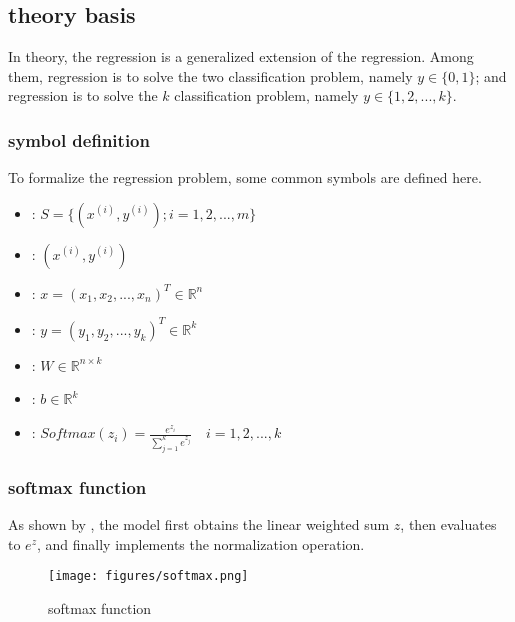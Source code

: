 \begin{content}
\begin{content}
\subsection{theory basis}

In theory, the  regression is a generalized extension of the  regression. Among them,  regression is to solve the two classification problem, namely $y \in \{ 0,1\}$; and  regression is to solve the $k $ classification problem, namely $y \in \{ 1,2,...,k\}$.

\subsubsection{symbol definition}

To formalize the  regression problem, some common symbols are defined here.

 \begin{itemize}
   \item {}: $ S = \{ ({x^{(i)}}, {y^{(i)}});i = 1,2,...,m\} $
   \item {}: $ ({x^{(i)}}, {y^{(i)}}) $
   \item {}: $ x = ({x_1},{x_2},...,{x_n})^{T} \in {\mathbb{R}^n} $
   \item {}: $ y = ({y_1},{y_2},...,{y_k})^{T} \in {\mathbb{R}^k} $
   \item {}: $ W \in {\mathbb{R}^{n \times k}} $   
   \item {}: $ b \in {\mathbb{R}^k} $   
   \item {}: $ 
Softmax {(z_i)} = \tfrac{{{e^{{z_i}}}}}{{\sum\limits_{j = 1}^k {{e^{{z_j}}}} }} \quad i = 1,2,...,k
$
 \end{itemize}

\subsubsection{softmax function}

As shown by , the model first obtains the linear weighted sum $z$, then evaluates to $e^z$, and finally implements the normalization operation.

\begin{figure}[H]
\centering
\texttt{[image: figures/softmax.png]}
\caption{softmax function}
 \label{fig:softmax}
\end{figure}


\end{content}
\end{content}
